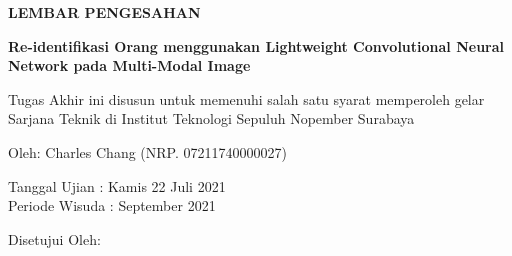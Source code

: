 \begin{center}
	\large
  \textbf{LEMBAR PENGESAHAN}
\end{center}

\thispagestyle{empty}

\begin{center}
  \textbf{Re-identifikasi Orang menggunakan
  	Lightweight Convolutional Neural Network pada Multi-Modal Image}
\end{center}

\begingroup
  \small

  \begin{center}
    Tugas Akhir ini disusun untuk memenuhi salah satu syarat memperoleh
    gelar Sarjana Teknik di Institut Teknologi Sepuluh Nopember Surabaya
  \end{center}

  \begin{center}
    Oleh: Charles Chang (NRP. 07211740000027)
  \end{center}

  \begin{center}
    Tanggal Ujian : Kamis 22 Juli 2021\\
    Periode Wisuda : September 2021
  \end{center}

  \begin{center}
    Disetujui Oleh:
  \end{center}

  \begingroup
    \setlength{\tabcolsep}{0pt}

